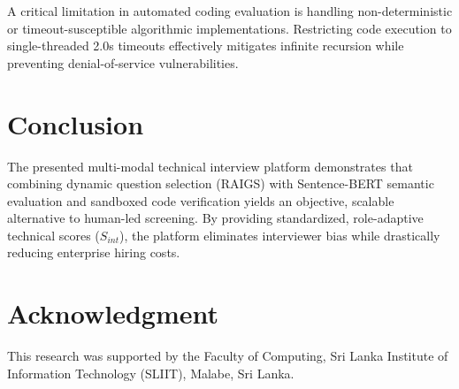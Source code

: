 \documentclass[conference]{IEEEtran}
\begin{document}
A critical limitation in automated coding evaluation is handling non-deterministic or timeout-susceptible algorithmic implementations. Restricting code execution to single-threaded 2.0s timeouts effectively mitigates infinite recursion while preventing denial-of-service vulnerabilities.

\section{Conclusion}
The presented multi-modal technical interview platform demonstrates that combining dynamic question selection (RAIGS) with Sentence-BERT semantic evaluation and sandboxed code verification yields an objective, scalable alternative to human-led screening. By providing standardized, role-adaptive technical scores ($S_{int}$), the platform eliminates interviewer bias while drastically reducing enterprise hiring costs.

\section*{Acknowledgment}
This research was supported by the Faculty of Computing, Sri Lanka Institute of Information Technology (SLIIT), Malabe, Sri Lanka.
\end{document}
